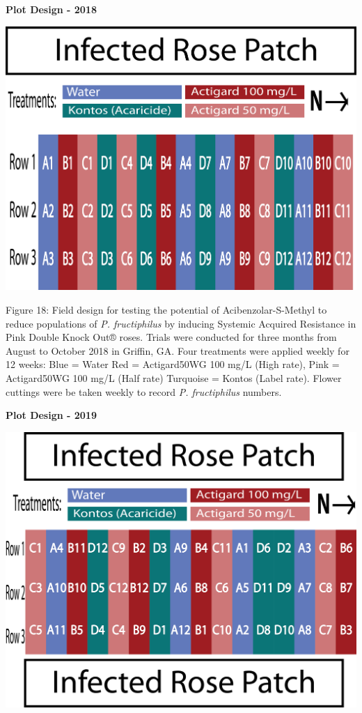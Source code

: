\documentclass[12pt,final,CPage]{ufthesis}
\begin{document}
{  \textbf{Plot Design - 2018}
  \begin{center}\includegraphics[width=0.8\linewidth]{figure/rrv_asm_plot_2018_griffin} \end{center}

  Figure 18: Field design for testing the potential of Acibenzolar-S-Methyl to reduce populations of \emph{P. fructiphilus} by inducing Systemic Acquired Resistance in Pink Double Knock Out® roses. Trials were conducted for three months from August to October 2018 in Griffin, GA. Four treatments were applied weekly for 12 weeks: Blue = Water Red = Actigard50WG 100 mg/L (High rate), Pink = Actigard50WG 100 mg/L (Half rate) Turquoise = Kontos (Label rate). Flower cuttings were be taken weekly to record \emph{P. fructiphilus} numbers.

  \textbf{Plot Design - 2019}
  \begin{center}\includegraphics[width=0.8\linewidth]{figure/rrv_asm_plot_2019_griffin} \end{center}

}
\end{document}
